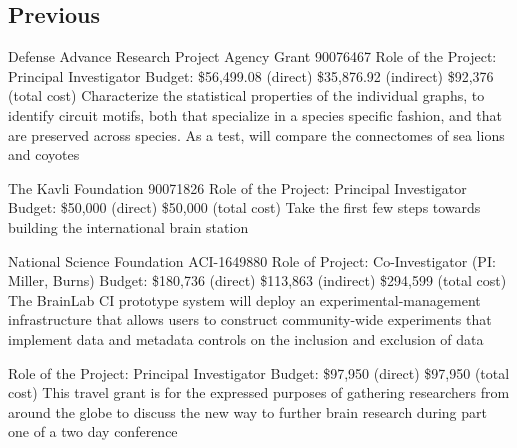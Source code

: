 \documentclass[10pt,colorlinks=true,urlcolor=blue]{moderncv}
\begin{document}

\subsection{Previous}
{\newline Defense Advance Research Project Agency Grant 90076467
\newline Role of the Project: Principal Investigator
\newline Budget: \$56,499.08 (direct) \$35,876.92 (indirect) \$92,376 (total cost)
\newline Characterize the statistical properties of the individual graphs, to identify circuit motifs,
both that specialize in a species specific fashion, and that are preserved across species.
As a test, will compare the connectomes of sea lions and coyotes}{}{}{}{}

{\newline The Kavli Foundation 90071826
\newline Role of the Project: Principal Investigator
\newline Budget: \$50,000 (direct) \$50,000 (total cost)
\newline Take the first few steps towards building the international brain station}{}{}{}{}

{\newline National Science Foundation ACI-1649880
\newline Role of Project: Co-Investigator (PI: Miller, Burns)
\newline Budget: \$180,736 (direct) \$113,863 (indirect) \$294,599 (total cost)
\newline The BrainLab CI prototype system will deploy an experimental-management
infrastructure that allows users to construct community-wide experiments that implement
data and metadata controls on the inclusion and exclusion of data}{}{}{}{}

{\newline Role of the Project: Principal Investigator
\newline Budget: \$97,950 (direct) \$97,950 (total cost)
\newline This travel grant is for the expressed purposes of gathering researchers from around the
globe to discuss the new way to further brain research during part one of a two day
conference}{}{}{}{}
\end{document}
